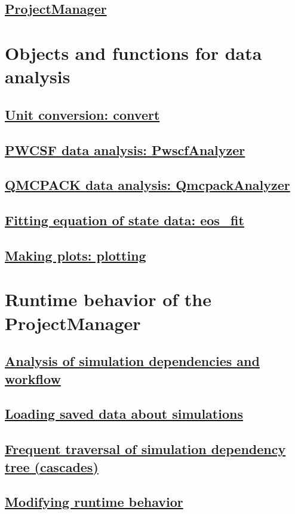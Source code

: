 \documentclass[oneside,11pt]{memoir}
\numberwithin{equation}{section}
\newcommand{\bu}[1]{\textbf{\underline{#1}}}
\begin{document}
\subsection{\bu{ProjectManager}}


\section{Objects and functions for data analysis}
\subsection{\bu{Unit conversion: convert}}
\subsection{\bu{PWCSF data analysis: PwscfAnalyzer}}
\subsection{\bu{QMCPACK data analysis: QmcpackAnalyzer}}
\subsection{\bu{Fitting equation of state data: eos\_fit}}
\subsection{\bu{Making plots: plotting}}


\section{Runtime behavior of the ProjectManager}
\subsection{\bu{Analysis of simulation dependencies and workflow}}
\subsection{\bu{Loading saved data about simulations}}
\subsection{\bu{Frequent traversal of simulation dependency tree (cascades)}}
\subsection{\bu{Modifying runtime behavior}}
\end{document}
